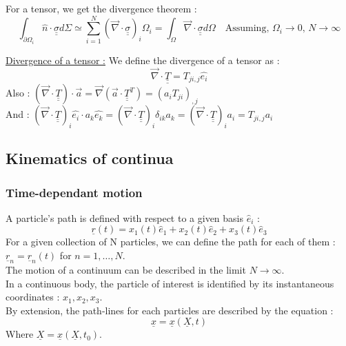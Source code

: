 \documentclass[../main.tex]{subfiles}
\begin{document}
For a tensor, we get the divergence theorem : \\
\begin{equation}
    \int_{\partial \Omega_i}\hat{n} \cdot \underline{\underline{\sigma}} d\Sigma \simeq \sum_{i=1}^N (\Vec{\nabla}\cdot \underline{\underline{\sigma}})_i \Omega_i = \int_{\Omega} \Vec{\nabla} \cdot \underline{\underline{\sigma}} d\Omega \quad \text{Assuming, $\Omega_i\rightarrow 0$, $N\rightarrow \infty$} 
\end{equation}
 
\quad \underline{Divergence of a tensor :} We define the divergence of a tensor as :\\
\begin{equation}
    \Vec{\nabla} \cdot \underline{\underline{T}} = T_{ji,j} \hat{e_i}
\end{equation}
Also : $(\Vec{\nabla} \cdot \underline{\underline{T}}) \cdot \Vec{a} = \Vec{\nabla} (\Vec{a} \cdot \underline{\underline{T}}^T) = (a_i T_{ji})_{,j}$\\
And : $(\Vec{\nabla} \cdot \underline{\underline{T}})_i \hat{e_i} \cdot a_k \hat{e_k} = (\Vec{\nabla} \cdot \underline{\underline{T}})_i \delta_{ik} a_k = (\Vec{\nabla} \cdot \underline{\underline{T}})_i a_i = T_{ji,j}a_i$\\

\subsection{Kinematics of continua}
\subsubsection{Time-dependant motion}

A particle's path is defined with respect to a given basis $\hat{e}_i$ : \\
\begin{equation}
    \underline{r}(t) = x_1(t) \hat{e}_1 + x_2(t) \hat{e}_2 + x_3(t) \hat{e}_3
\end{equation}
For a given collection of N particles, we can define the path for each of them : $\underline{r}_n = \underline{r}_n(t)$ for $n=1,\dots, N$.\\
The motion of a continuum can be described in the limit $N\rightarrow \infty$.\\

In a continuous body, the particle of interest is identified by its instantaneous coordinates : $x_1, x_2,x_3$.\\
By extension, the path-lines for each particles are described by the equation : \\
\begin{equation}
    \underline{x} = \underline{x}(\underline{X},t)
\end{equation}
Where $\underline{X} = \underline{x}(\underline{X},t_0)$.\\
\end{document}

